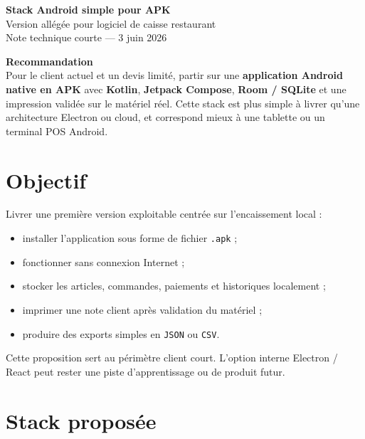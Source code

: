 \documentclass[11pt,a4paper]{article}
\begin{document}
\begin{center}
  {\fontsize{22}{26}\selectfont\bfseries\color{primary}
  Stack Android simple pour APK}\\[3pt]
  {\large Version allégée pour logiciel de caisse restaurant}\\[7pt]
  {\small\color{textgray}Note technique courte --- 3 juin 2026}
\end{center}

\begin{tcolorbox}[
  colback=softgreen,
  colframe=primary,
  boxrule=0.8pt,
  arc=2pt,
  left=8pt,right=8pt,top=7pt,bottom=7pt
]
\textbf{\color{primary}Recommandation}\\
Pour le client actuel et un devis limité, partir sur une \textbf{application Android native en APK}
avec \textbf{Kotlin}, \textbf{Jetpack Compose}, \textbf{Room / SQLite} et une impression validée
sur le matériel réel. Cette stack est plus simple à livrer qu'une architecture Electron ou cloud,
et correspond mieux à une tablette ou un terminal POS Android.
\end{tcolorbox}

\section{Objectif}

Livrer une première version exploitable centrée sur l'encaissement local :

\begin{itemize}
  \item installer l'application sous forme de fichier \texttt{.apk} ;
  \item fonctionner sans connexion Internet ;
  \item stocker les articles, commandes, paiements et historiques localement ;
  \item imprimer une note client après validation du matériel ;
  \item produire des exports simples en \texttt{JSON} ou \texttt{CSV}.
\end{itemize}

Cette proposition sert au périmètre client court. L'option interne Electron / React peut rester
une piste d'apprentissage ou de produit futur.

\section{Stack proposée}
\end{document}
